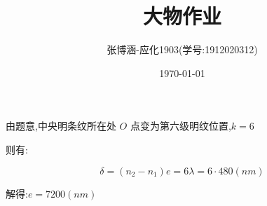 \documentclass{article}
\title{大物作业}
\author{张博涵-应化1903(学号:1912020312)}
\date{\today}
\begin{document}
	\maketitle
由题意,中央明条纹所在处 $O$ 点变为第六级明纹位置,$k = 6$


则有:

$$\delta = (n_2 - n_1)e = 6\lambda = 6 \cdot 480(nm)$$


解得:$ e = 7200(nm) $
\end{document}
